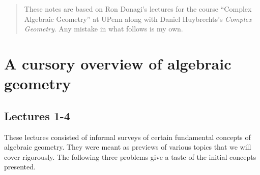 \documentclass[10pt,letterpaper,cm]{nupset}
\theoremstyle{definition}
\theoremstyle{theorem}
\theoremstyle{remark}
\newcommand{\1}{\mathbb{1}}
\newcommand{\0}{\vec 0}
\begin{document}
\thispagestyle{empty}
\begin{abstract}
These notes are based on Ron Donagi's lectures for the course ``Complex Algebraic Geometry'' at UPenn along with Daniel Huybrechts's \textit{Complex Geometry}. Any mistake in what follows is my own.
\end{abstract}

\tableofcontents
\newpage

\section{A cursory overview of algebraic geometry} 

\subsection{Lectures 1-4}

These lectures consisted of informal surveys of certain fundamental concepts of algebraic geometry. They were meant as previews of various topics that we will cover rigorously. The following three problems give a taste of the initial concepts presented.

\medskip
\end{document}
